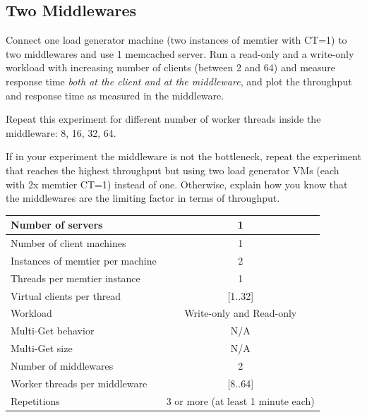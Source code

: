 \documentclass[11pt,a4paper]{article}
\begin{document}
\subsection{Two Middlewares}

Connect one load generator machine (two instances of memtier with CT=1) to two middlewares and use 1 memcached server. Run a read-only and a write-only workload with increasing number of clients (between 2 and 64) and measure response time \emph{both at the client and at the middleware}, and plot the throughput and response time as measured in the middleware.

Repeat this experiment for different number of worker threads inside the middleware: 8, 16, 32, 64.

If in your experiment the middleware is not the bottleneck, repeat the experiment that reaches the highest throughput but using two load generator VMs (each with 2x memtier CT=1) instead of one. Otherwise, explain how you know that the middlewares are the limiting factor in terms of throughput.

\begin{center}
	\scriptsize{
		\begin{tabular}{|l|c|}
			\hline Number of servers                & 1                        \\
			\hline Number of client machines        & 1                        \\
			\hline Instances of memtier per machine & 2                        \\
			\hline Threads per memtier instance     & 1                        \\
			\hline Virtual clients per thread       & [1..32]                  \\
			\hline Workload                         & Write-only and Read-only \\
			\hline Multi-Get behavior               & N/A                      \\
			\hline Multi-Get size                   & N/A                      \\
			\hline Number of middlewares            & 2                        \\
			\hline Worker threads per middleware    & [8..64]                  \\
			\hline Repetitions                      & 3 or more (at least 1 minute each)                \\
			\hline
		\end{tabular}
	}
\end{center}
\end{document}

